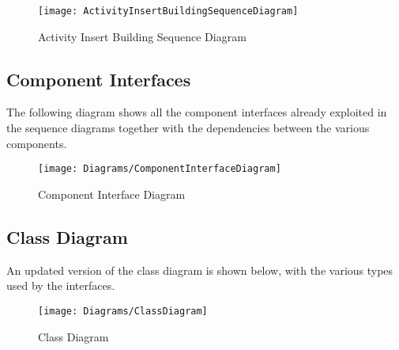 \begin{figure}[H]
 \centering
 \texttt{[image: ActivityInsertBuildingSequenceDiagram]}
 \caption{ Activity Insert Building Sequence Diagram }
 \end{figure}

\newpage
\subsection{Component Interfaces}
The following diagram shows all the component interfaces already exploited in the sequence diagrams together with the dependencies between the various components. 

\begin{figure}[H]
 \centering
 \texttt{[image: Diagrams/ComponentInterfaceDiagram]}
 \caption{ Component Interface Diagram }
 \end{figure}
  \newpage
 
 \subsection{Class Diagram}
An updated version of the class diagram is shown below, with the various types used by the interfaces.
 \begin{figure}[H]
 \centering
 \texttt{[image: Diagrams/ClassDiagram]}
 \caption{ Class Diagram }
 \end{figure}
\newpage

\newpage
